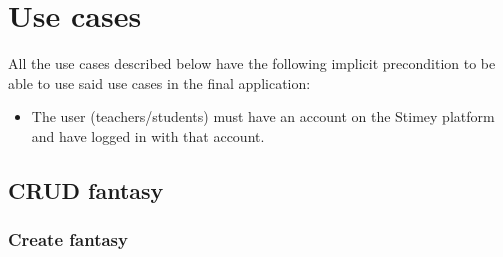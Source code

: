 \chapter{Use cases}
\noindent
All the use cases described below have the following implicit precondition to be able to use said use cases in the final application:
\begin{itemize}
	\item The user (teachers/students) must have an account on the Stimey platform and have logged in with that account.
\end{itemize}

\section{CRUD fantasy}
\hypertarget{crearfantasia}{}
\subsection{Create fantasy}

